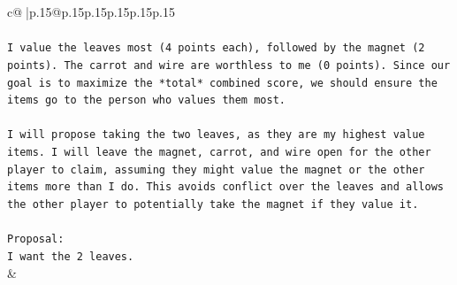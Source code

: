 \documentclass{article}
\begin{document}
{\begin{supertabular}{c@{$\;$}|p{.15\linewidth}@{}p{.15\linewidth}p{.15\linewidth}p{.15\linewidth}p{.15\linewidth}p{.15\linewidth}}
{{{\\ 
\\ 
\texttt{I value the leaves most (4 points each), followed by the magnet (2 points). The carrot and wire are worthless to me (0 points). Since our goal is to maximize the *total* combined score, we should ensure the items go to the person who values them most.} \\
\\ 
\texttt{I will propose taking the two leaves, as they are my highest value items. I will leave the magnet, carrot, and wire open for the other player to claim, assuming they might value the magnet or the other items more than I do. This avoids conflict over the leaves and allows the other player to potentially take the magnet if they value it.} \\
\\ 
\texttt{Proposal:} \\
\texttt{I want the 2 leaves.} \\
            }
        }
    }
    & \\ \\


\end{supertabular}}
\end{document}
